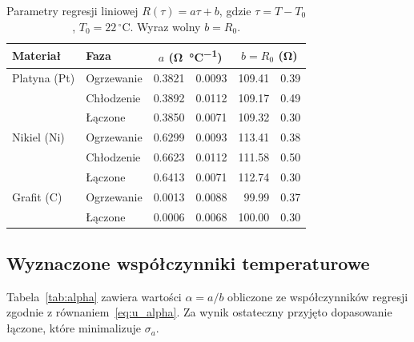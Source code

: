 \documentclass[12pt, a4paper]{article}
\begin{document}
\begin{table}[H]
\centering
\caption{Parametry regresji liniowej $R(\tau) = a\tau + b$, gdzie $\tau = T - T_0$, $T_0 = 22\,^\circ\mathrm{C}$.
         Wyraz wolny $b = R_0$.}\label{tab:regr}
\begin{tabular}{l l
    r @{$\;\pm\;$} r
    r @{$\;\pm\;$} r
}
\toprule
Materiał & Faza &
\multicolumn{2}{c}{$a$ (\si{\ohm\per\celsius})} &
\multicolumn{2}{c}{$b = R_0$ (\si{\ohm})} \\
\midrule
Platyna (Pt) & Ogrzewanie  & \num{0.3821} & \num{0.0093} & \num{109.41} & \num{0.39} \\
             & Chłodzenie  & \num{0.3892} & \num{0.0112} & \num{109.17} & \num{0.49} \\
             & Łączone     & \num{0.3850} & \num{0.0071} & \num{109.32} & \num{0.30} \\
\addlinespace
Nikiel (Ni)  & Ogrzewanie  & \num{0.6299} & \num{0.0093} & \num{113.41} & \num{0.38} \\
             & Chłodzenie  & \num{0.6623} & \num{0.0112} & \num{111.58} & \num{0.50} \\
             & Łączone     & \num{0.6413} & \num{0.0071} & \num{112.74} & \num{0.30} \\
\addlinespace
Grafit (C)   & Ogrzewanie  & \num{0.0013} & \num{0.0088} & \num{99.99}  & \num{0.37} \\
             & Łączone     & \num{0.0006} & \num{0.0068} & \num{100.00} & \num{0.30} \\
\bottomrule
\end{tabular}
\end{table}

\subsection{Wyznaczone współczynniki temperaturowe}

Tabela~\ref{tab:alpha} zawiera wartości $\alpha = a/b$ obliczone ze współczynników regresji
zgodnie z równaniem~\eqref{eq:u_alpha}.
Za wynik ostateczny przyjęto dopasowanie łączone, które minimalizuje $\sigma_a$.
\end{document}
